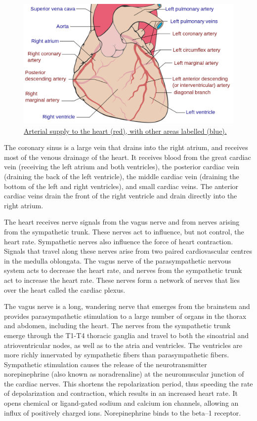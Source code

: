 \begin{figure}

{\centering \includegraphics[width=0.7\linewidth]{./figures/circulation/Coronary_arteries} 

}

\caption{\href{https://en.wikipedia.org/wiki/Heart\#/media/File:Coronary_arteries.svg}{Arterial supply to the heart (red), with other areas labelled (blue).}}\label{fig:coronaryvessels}
\end{figure}

The coronary sinus is a large vein that drains into the right atrium, and receives most of the venous drainage of the heart. It receives blood from the great cardiac vein (receiving the left atrium and both ventricles), the posterior cardiac vein (draining the back of the left ventricle), the middle cardiac vein (draining the bottom of the left and right ventricles), and small cardiac veins. The anterior cardiac veins drain the front of the right ventricle and drain directly into the right atrium.

The heart receives nerve signals from the vagus nerve and from nerves arising from the sympathetic trunk. These nerves act to influence, but not control, the heart rate. Sympathetic nerves also influence the force of heart contraction. Signals that travel along these nerves arise from two paired cardiovascular centres in the medulla oblongata. The vagus nerve of the parasympathetic nervous system acts to decrease the heart rate, and nerves from the sympathetic trunk act to increase the heart rate. These nerves form a network of nerves that lies over the heart called the cardiac plexus.

The vagus nerve is a long, wandering nerve that emerges from the brainstem and provides parasympathetic stimulation to a large number of organs in the thorax and abdomen, including the heart. The nerves from the sympathetic trunk emerge through the T1-T4 thoracic ganglia and travel to both the sinoatrial and atrioventricular nodes, as well as to the atria and ventricles. The ventricles are more richly innervated by sympathetic fibers than parasympathetic fibers. Sympathetic stimulation causes the release of the neurotransmitter norepinephrine (also known as noradrenaline) at the neuromuscular junction of the cardiac nerves. This shortens the repolarization period, thus speeding the rate of depolarization and contraction, which results in an increased heart rate. It opens chemical or ligand-gated sodium and calcium ion channels, allowing an influx of positively charged ions. Norepinephrine binds to the beta--1 receptor.

